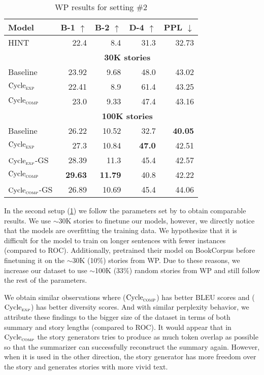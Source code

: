 \begin{table}[ht]
\centering
\begin{tabular}{l|rr|r|r}
Model & B-1 $\uparrow$ & B-2 $\uparrow$ & D-4 $\uparrow$ & PPL $\downarrow$  \\ \hline
HINT & 22.4 & 8.4 & 31.3 & 32.73 \\ \hline

 & \multicolumn{4}{c}{\textbf{30K stories}} \\ \hline
Baseline & 23.92 & 9.68 & 48.0  & 43.02 \\
$\text{Cycle}_{\textsc{exp}}$ & 22.41 & 8.9 & 61.4 & 43.25 \\
$\text{Cycle}_{\textsc{comp}}$ & 23.0 & 9.33 & 47.4 & 43.16 \\ \hline

 & \multicolumn{4}{c}{\textbf{100K stories}} \\ \hline
Baseline & 26.22 & 10.52 & 32.7  & \textbf{40.05} \\
$\text{Cycle}_{\textsc{exp}}$ & 27.3 & 10.84 & \textbf{47.0} & 42.51 \\
$\text{Cycle}_{\textsc{exp}}$-GS & 28.39 & 11.3 & 45.4 & 42.57 \\
$\text{Cycle}_{\textsc{comp}}$ & \textbf{29.63} & \textbf{11.79} & 40.8 & 42.22 \\
$\text{Cycle}_{\textsc{comp}}$-GS & 26.89 & 10.69 & 45.4 & 44.06
\end{tabular}
\caption{WP results for setting \#2}
\label{table:wp_2_results}
\end{table}

In the second setup (\cref{table:wp_2_results}) we follow the parameters set by \citep{guan2021long} to obtain comparable results. We use $\sim$30K stories to finetune our models, however, we directly notice that the models are overfitting the training data. We hypothesize that it is difficult for the model to train on longer sentences with fewer instances (compared to ROC). Additionally, \citep{guan2021long} pretrained their model on BookCorpus before finetuning it on the $\sim$30K (10\%) stories from WP. Due to these reasons, we increase our dataset to use $\sim$100K (33\%) random stories from WP and still follow the rest of the parameters.

We obtain similar observations where ($\text{Cycle}_{\textsc{comp}}$) has better BLEU scores and ($\text{Cycle}_{\textsc{exp}}$) has better diversity scores. And with similar perplexity behavior, we attribute these findings to the bigger size of the dataset in terms of both summary and story lengths (compared to ROC). It would appear that in $\text{Cycle}_{\textsc{comp}}$ the story generators tries to produce as much token overlap as possible so that the summarizer can successfully reconstruct the summary again. However, when it is used in the other direction, the story generator has more freedom over the story and generates stories with more vivid text.

